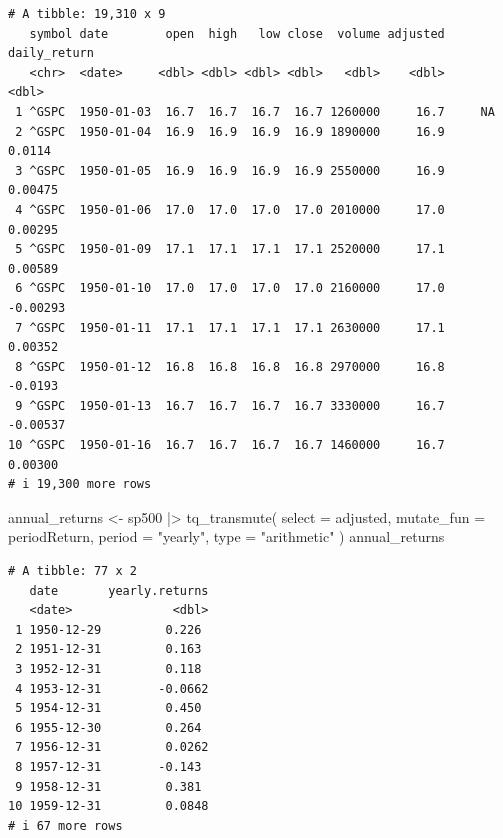 \documentclass[
  letterpaper,
  DIV=11,
  numbers=noendperiod]{scrartcl}
\newenvironment{Shaded}{\begin{snugshade}}{\end{snugshade}}
\newcommand{\AttributeTok}[1]{\textcolor[rgb]{0.40,0.45,0.13}{#1}}
\newcommand{\FunctionTok}[1]{\textcolor[rgb]{0.28,0.35,0.67}{#1}}
\newcommand{\NormalTok}[1]{\textcolor[rgb]{0.00,0.23,0.31}{#1}}
\newcommand{\OtherTok}[1]{\textcolor[rgb]{0.00,0.23,0.31}{#1}}
\newcommand{\SpecialCharTok}[1]{\textcolor[rgb]{0.37,0.37,0.37}{#1}}
\newcommand{\StringTok}[1]{\textcolor[rgb]{0.13,0.47,0.30}{#1}}
\begin{document}
\begin{verbatim}
# A tibble: 19,310 x 9
   symbol date        open  high   low close  volume adjusted daily_return
   <chr>  <date>     <dbl> <dbl> <dbl> <dbl>   <dbl>    <dbl>        <dbl>
 1 ^GSPC  1950-01-03  16.7  16.7  16.7  16.7 1260000     16.7     NA      
 2 ^GSPC  1950-01-04  16.9  16.9  16.9  16.9 1890000     16.9      0.0114 
 3 ^GSPC  1950-01-05  16.9  16.9  16.9  16.9 2550000     16.9      0.00475
 4 ^GSPC  1950-01-06  17.0  17.0  17.0  17.0 2010000     17.0      0.00295
 5 ^GSPC  1950-01-09  17.1  17.1  17.1  17.1 2520000     17.1      0.00589
 6 ^GSPC  1950-01-10  17.0  17.0  17.0  17.0 2160000     17.0     -0.00293
 7 ^GSPC  1950-01-11  17.1  17.1  17.1  17.1 2630000     17.1      0.00352
 8 ^GSPC  1950-01-12  16.8  16.8  16.8  16.8 2970000     16.8     -0.0193 
 9 ^GSPC  1950-01-13  16.7  16.7  16.7  16.7 3330000     16.7     -0.00537
10 ^GSPC  1950-01-16  16.7  16.7  16.7  16.7 1460000     16.7      0.00300
# i 19,300 more rows
\end{verbatim}

\begin{Shaded}
\begin{Highlighting}[]
\NormalTok{    annual\_returns }\OtherTok{\textless{}{-}}\NormalTok{ sp500 }\SpecialCharTok{|\textgreater{}} 
        \FunctionTok{tq\_transmute}\NormalTok{(}
            \AttributeTok{select =}\NormalTok{ adjusted,}
            \AttributeTok{mutate\_fun =}\NormalTok{ periodReturn,}
            \AttributeTok{period =} \StringTok{"yearly"}\NormalTok{,}
            \AttributeTok{type =} \StringTok{"arithmetic"}
\NormalTok{        )}
\NormalTok{        annual\_returns}
\end{Highlighting}
\end{Shaded}

\begin{verbatim}
# A tibble: 77 x 2
   date       yearly.returns
   <date>              <dbl>
 1 1950-12-29         0.226 
 2 1951-12-31         0.163 
 3 1952-12-31         0.118 
 4 1953-12-31        -0.0662
 5 1954-12-31         0.450 
 6 1955-12-30         0.264 
 7 1956-12-31         0.0262
 8 1957-12-31        -0.143 
 9 1958-12-31         0.381 
10 1959-12-31         0.0848
# i 67 more rows
\end{verbatim}
\end{document}
